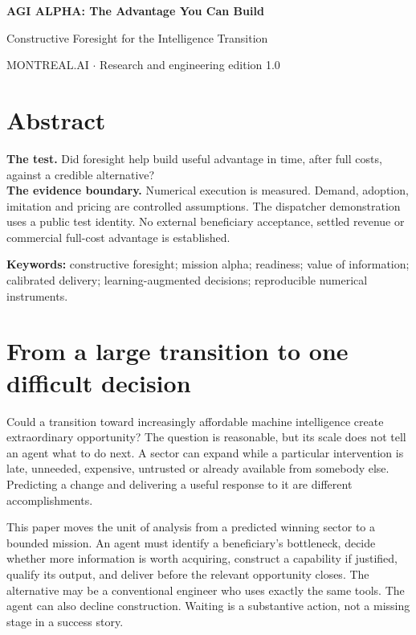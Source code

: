 \documentclass[11pt,a4paper]{article}
\begin{document}
\begin{center}
{\Large\sffamily\bfseries AGI ALPHA: The Advantage You Can Build}\par
\vspace{3pt}
{\large Constructive Foresight for the Intelligence Transition}\par
\vspace{6pt}
MONTREAL.AI \quad $\cdot$ \quad Research and engineering edition 1.0
\end{center}
\section*{Abstract}


\begin{claimbox}
\textbf{The test.} Did foresight help build useful advantage in time, after full costs, against a credible alternative?\\[3pt]
\textbf{The evidence boundary.} Numerical execution is measured. Demand, adoption, imitation and pricing are controlled assumptions. The dispatcher demonstration uses a public test identity. No external beneficiary acceptance, settled revenue or commercial full-cost advantage is established.
\end{claimbox}
\vspace{2mm}
\textbf{Keywords:} constructive foresight; mission alpha; readiness; value of information; calibrated delivery; learning-augmented decisions; reproducible numerical instruments.

\section{From a large transition to one difficult decision}
Could a transition toward increasingly affordable machine intelligence create extraordinary opportunity? The question is reasonable, but its scale does not tell an agent what to do next. A sector can expand while a particular intervention is late, unneeded, expensive, untrusted or already available from somebody else. Predicting a change and delivering a useful response to it are different accomplishments.

This paper moves the unit of analysis from a predicted winning sector to a bounded mission. An agent must identify a beneficiary's bottleneck, decide whether more information is worth acquiring, construct a capability if justified, qualify its output, and deliver before the relevant opportunity closes. The alternative may be a conventional engineer who uses exactly the same tools. The agent can also decline construction. Waiting is a substantive action, not a missing stage in a success story.
\end{document}

